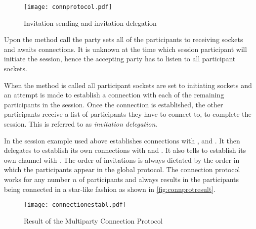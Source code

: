 \begin{figure}[H]
\begin{center}
\texttt{[image: connprotocol.pdf]}
\caption{Invitation sending and invitation delegation}
\label{fig:sessioncreation}
\end{center}
\end{figure}

Upon the method call  the party sets all of the participants to receiving sockets and awaits connections. It is unknown at the time which session participant will initiate the session, hence the accepting party has to listen to all participant sockets.

When the method  is called all participant sockets are set to initiating sockets and an attempt is made to establish a connection with each of the remaining participants in the session. Once the connection is established, the other participants receive a list of participants they have to connect to, to complete the session. This is referred to as \textit{invitation delegation}.

In the session example used above  establishes connections with ,  and . It then delegates  to establish its own connections with  and . It also tells  to establish its own channel with . The order of invitations is always dictated by the order in which the participants appear in the global protocol. The connection protocol works for any number $n$ of participants and always results in the participants being connected in a star-like fashion as shown in \autoref{fig:connprotresult}.

\begin{figure}[H]
\begin{center}
\texttt{[image: connectionestabl.pdf]}
\caption{Result of the Multiparty Connection Protocol}
\label{fig:connprotresult}
\end{center}
\end{figure}










